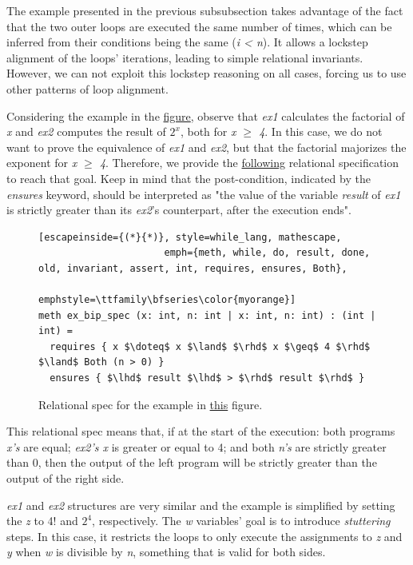 The example presented in the previous subsubsection takes advantage of the fact that the two outer loops are executed the same number of times, which can be inferred from their conditions being the same (\emph{i < n}).
It allows a lockstep alignment of the loops' iterations, leading to simple relational invariants.
However, we can not exploit this lockstep reasoning on all cases, forcing us to use other patterns of loop alignment.

Considering the example in the \hyperref[fig:cond_align_loops_ex]{figure}, observe that \emph{ex1} calculates the factorial of \emph{x} and \emph{ex2} computes the result of \emph{$2^x$}, both for \emph{x $\geq$ 4}.
In this case, we do not want to prove the equivalence of \emph{ex1} and \emph{ex2}, but that the factorial majorizes the exponent for \emph{x $\geq$ 4}.
Therefore, we provide the \hyperref[fig:cond_align_loops_rel_spec]{following} relational specification to reach that goal.
Keep in mind that the post-condition, indicated by the \emph{ensures} keyword, should be interpreted as "the value of the variable \emph{result} of \emph{ex1} is strictly greater than its \emph{ex2}'s counterpart, after the execution ends".

\begin{figure}[h]
  \centering
  \noindent
  \begin{lstlisting}[escapeinside={(*}{*)}, style=while_lang, mathescape,
                      emph={meth, while, do, result, done, old, invariant, assert, int, requires, ensures, Both},
                      emphstyle=\ttfamily\bfseries\color{myorange}]
meth ex_bip_spec (x: int, n: int | x: int, n: int) : (int | int) =
  requires { x $\doteq$ x $\land$ $\rhd$ x $\geq$ 4 $\rhd$ $\land$ Both (n > 0) }
  ensures { $\lhd$ result $\lhd$ > $\rhd$ result $\rhd$ }
  \end{lstlisting}
  \caption{Relational spec for the example in \hyperref[fig:cond_align_loops_ex]{this} figure.}
  \label{fig:cond_align_loops_rel_spec}
\end{figure}

This relational spec means that, if at the start of the execution: both programs \emph{x's} are equal; \emph{ex2's x} is greater or equal to 4; and both \emph{n's} are strictly greater than 0, then the output of the left program will be strictly greater than the output of the right side.

\emph{ex1} and \emph{ex2} structures are very similar and the example is simplified by setting the \emph{z} to 4! and $2^4$, respectively.
The \emph{w} variables' goal is to introduce \emph{stuttering} steps.
In this case, it restricts the loops to only execute the assignments to \emph{z} and \emph{y} when \emph{w} is divisible by \emph{n}, something that is valid for both sides.


